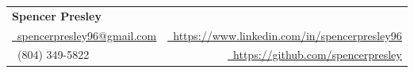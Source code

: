 \documentclass[letterpaper,11pt]{article}
\makeatletter
\newcommand{\resumePlainTextSubheading}[1]{
  \vspace{-2pt}\item
    \begin{tabular*}{0.97\textwidth}[t]{@{}p{0.97\textwidth}@{}}
      #1 \\
    \end{tabular*}\vspace{-7pt}
}
\newcommand{\resumeSubHeadingListStart}{\begin{itemize}[leftmargin=0.15in, label={}]}
\newcommand{\resumeSubHeadingListEnd}{\end{itemize}}
\makeatother
\begin{document}
 \begin{tabular*}{\textwidth}{l@{\extracolsep{\fill}}r}
  \textbf{{\Large Spencer Presley}} \\
    \href{mailto:spencerpresley96@gmail.com}{\faEnvelopeO\ \underline{spencerpresley96@gmail.com}} & \href{https://www.linkedin.com/in/spencerpresley96}{\faLinkedin\ \underline{https://www.linkedin.com/in/spencerpresley96}} \\
   \faMobile\ (804) 349-5822 &
   \href{https://github.com/spencerpresley}{\faGithub\ \underline{https://github.com/spencerpresley}} \\
 \end{tabular*}


\begin{comment}
\begin{center}
    \textbf{\LARGE \scshape Spencer Presley} \\ \vspace{2pt}
    \normalsize 804-349-5822 $|$ \href{mailto:contact@spencerpresley.com} {\normalsize contact@spencerpresley.com} $|$
    \href{https://www.github.com/SpencerPresley}{\normalsize github.com/SpencerPresley}
\end{center}
\end{comment}

\begin{comment}
\section{Objective}
    \resumeSubHeadingListStart
        \resumePlainTextSubheading{Highly motivated computer science major with a robust academic foundation. Seeking the opportunity to continue expanding and improving my skills while also using my current skill-set to provide value to a team.}
    \resumeSubHeadingListEnd
\end{comment}

\end{document}
